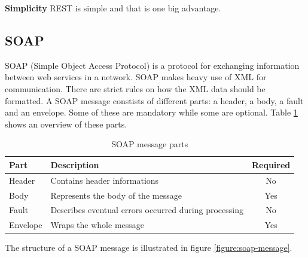 \textbf{Simplicity}\newline
REST is simple and that is one big advantage.

\subsection{SOAP}\cite{SOAP}
\label{subsec:soap}
SOAP (Simple Object Access Protocol) is a protocol for exchanging information between web services in a network.
SOAP makes heavy use of XML for communication. There are strict rules on how the XML data should be formatted.
A SOAP message constists of different parts: a header, a body, a fault and an envelope. Some of these
are mandatory while some are optional. Table \ref{table:soap-message} shows an overview of these parts.

\begin{table}[h]
\begin{center}
\begin{tabular}{ | l | l | c | }
  \hline
  Part  & Description & Required \\
  \hline\noalign{\smallskip}\hline
  Header & Contains header informations & No \\
  Body   & Represents the body of the message   & Yes \\
  Fault  & Describes eventual errors occurred during processing  & No \\
  Envelope & Wraps the whole message & Yes \\
  \hline
\end{tabular}
\end{center}
\caption{SOAP message parts}
\label{table:soap-message}
\end{table}

The structure of a SOAP message is illustrated in figure \ref{figure:soap-message}.

